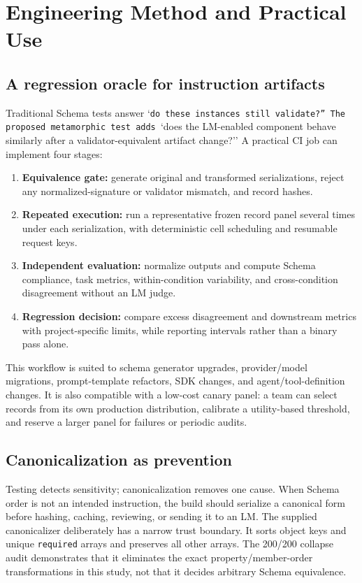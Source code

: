 \documentclass[11pt,a4paper]{article}
\begin{document}
\section{Engineering Method and Practical Use}
\subsection{A regression oracle for instruction artifacts}
Traditional Schema tests answer `\texttt{do these\allowbreak{} instanc\allowbreak{}es still\allowbreak{} validat\allowbreak{}e?'' The\allowbreak{} propose\allowbreak{}d metamo\allowbreak{}rphic te\allowbreak{}st adds }`does the LM-enabled component behave similarly after a validator-equivalent artifact change?'' A practical CI job can implement four stages:

\begin{enumerate}
\item \textbf{Equivalence gate:} generate original and transformed serializations, reject any normalized-signature or validator mismatch, and record hashes.
\item \textbf{Repeated execution:} run a representative frozen record panel several times under each serialization, with deterministic cell scheduling and resumable request keys.
\item \textbf{Independent evaluation:} normalize outputs and compute Schema compliance, task metrics, within-condition variability, and cross-condition disagreement without an LM judge.
\item \textbf{Regression decision:} compare excess disagreement and downstream metrics with project-specific limits, while reporting intervals rather than a binary pass alone.
\end{enumerate}
This workflow is suited to schema generator upgrades, provider/model migrations, prompt-template refactors, SDK changes, and agent/tool-definition changes. It is also compatible with a low-cost canary panel: a team can select records from its own production distribution, calibrate a utility-based threshold, and reserve a larger panel for failures or periodic audits.

\subsection{Canonicalization as prevention}
Testing detects sensitivity; canonicalization removes one cause. When Schema order is not an intended instruction, the build should serialize a canonical form before hashing, caching, reviewing, or sending it to an LM. The supplied canonicalizer deliberately has a narrow trust boundary. It sorts object keys and unique \texttt{required} arrays and preserves all other arrays. The 200/200 collapse audit demonstrates that it eliminates the exact property/member-order transformations in this study, not that it decides arbitrary Schema equivalence.
\end{document}
